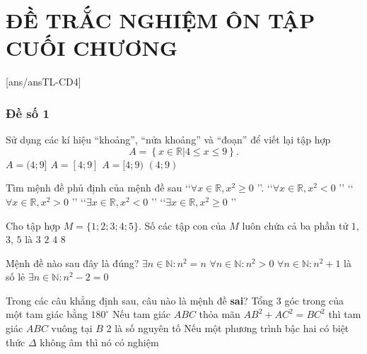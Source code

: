\section{ĐỀ TRẮC NGHIỆM ÔN TẬP CUỐI CHƯƠNG}
[ans/ansTL-CD4]
\setcounter{ex}{0}
\subsubsection{Đề số 1}

\begin{ex}%
	Sử dụng các kí hiệu ``khoảng'', ``nửa khoảng'' và ``đoạn'' để viết lại tập
	hợp $$A=\left\{x \in \mathbb{R}|4 \leq x \leq 9\right\}.$$
	\choice
	{$A=(4;9]$}
	{\True $A=[4;9]$}
	{$A=[4;9)$}
	{$(4;9)$}
\end{ex}

\begin{ex}%
	Tìm mệnh đề phủ định của mệnh đề sau \lq \lq $\forall x \in \mathbb{R},x^2 \geq 0$ \rq \rq.
	\choice
	{\lq \lq $\forall x \in \mathbb{R},x^2<0$ \rq \rq}
	{\lq \lq $\forall x \in \mathbb{R},x^2>0$ \rq \rq}
	{\True \lq \lq $\exists x \in \mathbb{R},x^2<0$ \rq \rq}
	{\lq \lq $\exists x \in \mathbb{R},x^2 \geq 0$ \rq \rq}
\end{ex}

\begin{ex}%
	Cho tập hợp $M=\{1;2;3;4;5\}$. Số các tập con của $M$ luôn chứa cả ba phần tử $1$, $3$, $5$ là
	\choice
	{$3$}
	{$2$}
	{\True $4$}
	{$8$}
\end{ex}

\begin{ex}%
	Mệnh đề nào sau đây là đúng?
	\choice
	{\True $\exists n\in\mathbb{N}: n^2=n$}
	{$\forall n\in\mathbb{N}: n^2>0$}
	{$\forall n\in\mathbb{N}: n^2+1$ là số lẻ}
	{$\exists n\in\mathbb{N}: n^2-2=0$}
\end{ex}

\begin{ex}%
	Trong các câu khẳng định sau, câu nào là mệnh đề \textbf{sai}?
	\choice
	{Tổng $3$ góc trong của một tam giác bằng $180^\circ$}
	{\True Nếu tam giác $ABC$ thỏa mãn $AB^2+AC^2=BC^2$ thì tam giác $ABC$ vuông tại $B$}
	{2 là số nguyên tố}
	{Nếu một phương trình bậc hai có biệt thức $\Delta$ không âm thì nó có nghiệm}
\end{ex}


